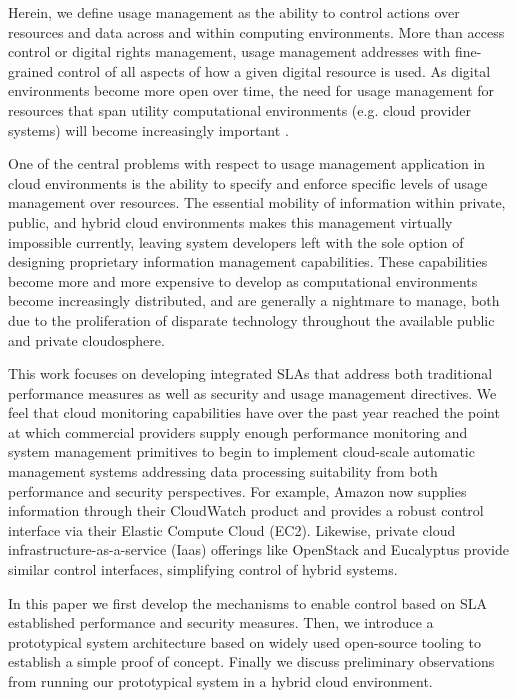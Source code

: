 \documentclass{sig-alternate}
\begin{document}
Herein, we define usage management as the ability to control actions over resources and data across and within computing environments.  More than access control or digital rights management, usage management addresses with fine-grained control of all aspects of how a given digital resource is used.  As digital environments become more open over time, the need for usage management for resources that span utility computational environments (e.g. cloud provider systems) will become increasingly important \cite{ctrl:lamb-MCCCS,ctrl:lamb-SOSE}.

One of the central problems with respect to usage management application in cloud environments is the ability to specify and enforce specific levels of usage management over resources.  The essential mobility of information within private, public, and hybrid cloud environments makes this management virtually impossible currently, leaving system developers left with the sole option of designing proprietary information management capabilities.  These capabilities become more and more expensive to develop as computational environments become increasingly distributed, and are generally a nightmare to manage, both due to the proliferation of disparate technology throughout the available public and private cloudosphere. 

This work focuses on developing integrated SLAs that address both traditional performance measures as well as security and usage management directives.  We feel that cloud monitoring capabilities have over the past year reached the point at which commercial providers supply enough performance monitoring and system management primitives to begin to implement cloud-scale automatic management systems addressing data processing suitability from both performance and security perspectives.  For example, Amazon now supplies information through their CloudWatch product and provides a robust control interface via their Elastic Compute Cloud (EC2).  Likewise, private cloud infrastructure-as-a-service (Iaas) offerings like OpenStack and Eucalyptus provide similar control interfaces, simplifying control of hybrid systems.

In this paper we first develop the mechanisms to enable control based on SLA established performance and security measures.  Then, we introduce a prototypical system architecture based on widely used open-source tooling to establish a simple proof of concept.  Finally we discuss preliminary observations from running our prototypical system in a hybrid cloud environment.
\end{document}
